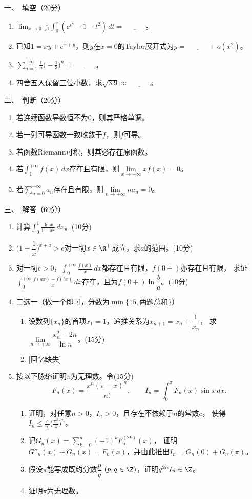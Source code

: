 一、\ 填空（20分）
\begin{enumerate}
    \item $\displaystyle\lim_{x\to0}\frac{1}{x^5}\int_0^x(e^{t^2}-1-t^2)\,dt=\underline{\qquad\quad}$。
    \item 已知$1=xy+e^{x+y}$，则$y$在$x=0$的Taylor展开式为$y=\underline{\qquad\quad}+o(x^2)$。
    \item $\displaystyle\sum_{n=1}^{+\infty}\frac{1}{n}\Big(\!-\frac{1}{3}\Big)^n=\underline{\qquad\quad}$。
    \item 四舍五入保留三位小数，求$\sqrt{3.9}\approx\underline{\qquad\quad}$。
\end{enumerate}
二、\ 判断（20分）
\begin{enumerate}
    \item 若连续函数导数恒不为$0$，则其严格单调。
    \item 若一列可导函数一致收敛于$f$，则$f$可导。
    \item 若函数Riemann可积，则其必存在原函数。
    \item 若$\displaystyle\int_1^{+\infty}f(x)\,dx$存在且有限，则$\lim\limits_{x\to+\infty}xf(x)=0$。
    \item 若$\displaystyle\sum_{n=0}^{+\infty}a_n$存在且有限，则$\lim\limits_{n\to+\infty}na_n=0$。
\end{enumerate}
三、\ 解答（60分）
\begin{enumerate}
    \item 计算$\displaystyle\int_0^1\frac{\ln x}{1-x^2}\,dx$。(10分)
    \item $\Big(1+\dfrac{1}{x}\Big)^{x+a}>e$对一切$x\in\R^+$成立，求$a$的范围。(10分)
    \item 对一切$c>0$，$\displaystyle\int_0^{+\infty}\frac{f(x)}{x}\,dx$都存在且有限，$f(0+)$亦存在且有限，
    求证$\displaystyle\int_0^{+\infty}\frac{f(ax)-f(bx)}{x}\,dx$存在，且为$f(0+)\ln\dfrac{b}{a}$。(10分)
    \item 二选一（做一个即可，分数为$\min\{15,\text{两题总和}\}$）
    \begin{enumerate}[label=(\alph*)]
    \item 设数列$\{x_n\}$的首项$x_1=1$，递推关系为$x_{n+1}=x_n+\dfrac{1}{x_n}$，
    求$\lim\limits_{n\to+\infty}\dfrac{x_n^2-2n}{\ln n}$。(15分)
    \item { }[回忆缺失]
    \end{enumerate}
    \item 按以下脉络证明$\pi$为无理数。令(15分)
    \[F_n(x)=\frac{x^n(\pi-x)^n}{n!}, \qquad I_n=\int_0^\pi F_n(x)\sin x\,dx.\]
    \begin{enumerate}[label=(\arabic*)]
    \item 证明，对任意$n>0$，$I_n>0$，且存在不依赖于$n$的常数$c$，
    使得$\displaystyle I_n\leqslant\frac{c}{n!}\bigg(\frac{\pi^2}{4}\bigg)^n$。
    \item 记$\displaystyle G_n(x)=\sum_{k=0}^n(-1)^kF^{(2k)}_n(x)$，
    证明$G''_n(x)+G_n(x)=F_n(x)$，并由此推出$I_n=G_n(0)+G_n(\pi)$。
    \item 假设$\pi$能写成既约分数$\dfrac{p}{q}$ $(p,q\in\Z)$，证明$q^{2n}I_n\in\Z$。
    \item 证明$\pi$为无理数。
    \end{enumerate}
\end{enumerate}

